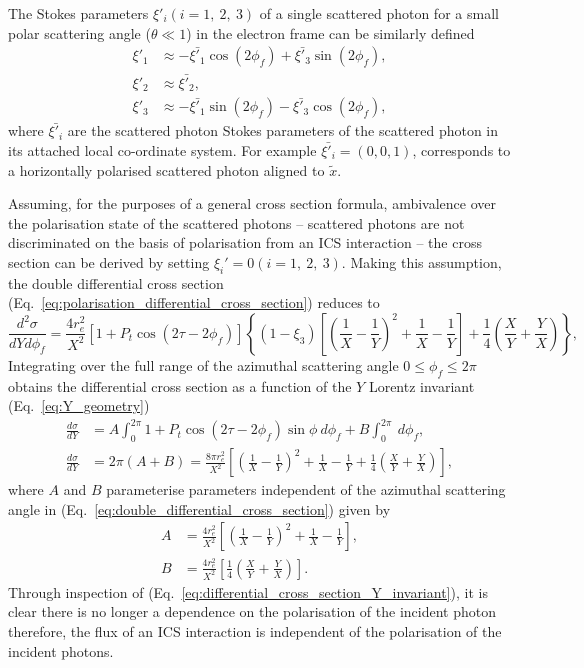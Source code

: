\documentclass[../main.tex]{subfiles}
\begin{document}
The Stokes parameters $\xi'_{i} \left(i=1,~2,~3\right)$ of a single scattered photon  for a small polar scattering angle ($\theta \ll 1$) in the electron frame can be similarly defined
\begin{align}
\xi'_{1} &\approx -\bar{\xi'_{1}}\cos\left(2\phi_{f}\right)+\bar{\xi'_{3}}\sin\left(2\phi_{f}\right), \\
\xi'_{2} &\approx \bar{\xi'_{2}}, \\
\xi'_{3} &\approx -\bar{\xi'_{1}}\sin\left(2\phi_{f}\right)-\bar{\xi'_{3}}\cos\left(2\phi_{f}\right),
\end{align}
where $\bar{\xi'_{i}}$ are the scattered photon Stokes parameters of the scattered photon in its attached local co-ordinate system. For example $\bar{\xi'_{i}} = \left(0, 0, 1\right)$, corresponds to a horizontally polarised scattered photon aligned to $\tilde{x}$. 

Assuming, for the purposes of a general cross section formula, ambivalence over the polarisation state of the scattered photons -- scattered photons are not discriminated on the basis of polarisation from an ICS interaction -- the cross section can be derived by setting $\xi_{i}' = 0 \left(i=1,~2,~3\right)$. Making this assumption, the double differential cross section (Eq.~\ref{eq:polarisation_differential_cross_section}) reduces to
\begin{equation}
\frac{d^{2}\sigma}{dYd\phi_{f}} =  \frac{4r_{e}^{2}}{X^{2}}\left[1+P_{t}\cos\left(2\tau-2\phi_{f}\right)\right]\left\{\left(1-\xi_{3}\right)\left[\left(\frac{1}{X}-\frac{1}{Y}\right)^{2}+\frac{1}{X}-\frac{1}{Y}\right]+\frac{1}{4}\left(\frac{X}{Y}+\frac{Y}{X}\right)\right\},
\label{eq:double_differential_cross_section}    
\end{equation}
Integrating over the full range of the azimuthal scattering angle $0 \leq \phi_{f} \leq 2\pi$ obtains the differential cross section as a function of the $Y$ Lorentz invariant (Eq.~\ref{eq:Y_geometry}) 
\begin{align}
 \frac{d\sigma}{dY} &= A\int_{0}^{2\pi}1+P_{t}\cos\left(2\tau-2\phi_{f}\right)\sin\phi~d\phi_{f}+ B\int_{0}^{2\pi}~d\phi_{f}, \nonumber \\
 \frac{d\sigma}{dY} &= 2\pi\left(A+B\right) = \frac{8\pi r_{e}^{2}}{X^{2}}\left[\left(\frac{1}{X}-\frac{1}{Y}\right)^{2}+\frac{1}{X}-\frac{1}{Y}+\frac{1}{4}\left(\frac{X}{Y}+\frac{Y}{X}\right)\right],
\label{eq:differential_cross_section_Y_invariant}
\end{align}
where $A$ and $B$ parameterise parameters independent of the azimuthal scattering angle in (Eq.~\ref{eq:double_differential_cross_section}) given by
\begin{align}
A &= \frac{4r_{e}^{2}}{X^{2}}\left[\left(\frac{1}{X}-\frac{1}{Y}\right)^{2}+\frac{1}{X}-\frac{1}{Y}\right], \nonumber\\
B &= \frac{4r_{e}^{2}}{X^{2}}\left[\frac{1}{4}\left(\frac{X}{Y}+\frac{Y}{X}\right)\right].
\label{eq:phif_independent_parameters}
\end{align}
Through inspection of (Eq.~\ref{eq:differential_cross_section_Y_invariant}), it is clear there is no longer a dependence on the polarisation of the incident photon therefore, the flux of an ICS interaction is independent of the polarisation of the incident photons.
\end{document}
